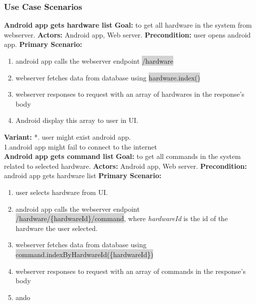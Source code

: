 \documentclass[12pt, oneside, a4paper]{book}
\newcommand{\code}[1]{{\color{red}\colorbox{lightgray}{#1}}}
\newcommand\boldcolor[1]{\textcolor{bold}{\textbf{#1}}}
\begin{document}
				\newpage\subsubsection{Use Case Scenarios}
				
				\boldcolor{Android app gets hardware list}
				\newline\textbf{Goal:} to get all hardware in the system from webserver.
				\newline\textbf{Actors:} Android app, Web server.
				\newline\textbf{Precondition:} user opens android app.
				\newline\textbf{Primary Scenario:}	
				\begin{enumerate}[label*=\arabic*.]
					\item android app calls the webserver endpoint \code{/hardware}
					\item webserver fetches data from database using \code{hardware.index()}
					\item webserver responses to request with an array of hardwares in the response's body
					\item Android display this array to user in UI.
				\end{enumerate}
				\textbf{Variant:}\newline
				\hspace*{5mm}*. user might exist android app. \\
				\hspace*{5mm}1.android app might fail to connect to the internet \\
				\newline\boldcolor{Android app gets command list}
				\newline\textbf{Goal:} to get all commands in the system related to selected hardware.
				\newline\textbf{Actors:} Android app, Web server.
				\newline\textbf{Precondition:} android app gets hardware list
				\newline\textbf{Primary Scenario:}	
				\begin{enumerate}[label*=\arabic*.]
					\item user selects hardware from UI.
					\item android app calls the webserver endpoint \code{/hardware/\{hardwareId\}/command}, where \textit{hardwareId} is the id of the hardware the user selected.
					\item webserver fetches data from database using \code{command.indexByHardwareId(\{hardwareId\})}
					\item webserver responses to request with an array of commands in the response's body
					\item ando
				\end{enumerate}
\end{document}
